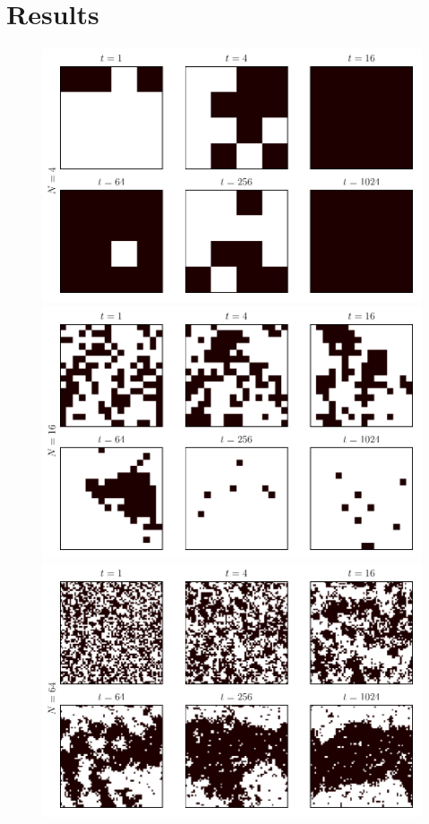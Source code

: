 \documentclass{llncs}
\begin{document}
\section{Results}
\begin{figure}
	\centering
\includegraphics[scale=0.25]{images/image4_0_0.pdf}
\includegraphics[scale=0.25]{images/image16_0_0.pdf}
\includegraphics[scale=0.25]{images/image64_0_0.pdf}

\end{figure}
\end{document}

